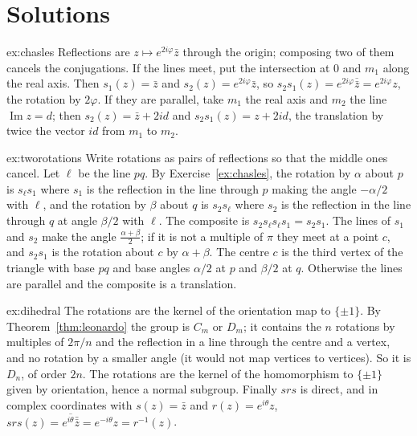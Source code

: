 \section{Solutions}

\begin{solution}{ex:chasles}
\idea Reflections are $z\mapsto e^{2i\varphi}\bar z$ through the origin; composing two of them cancels the conjugations.
\writeup If the lines meet, put the intersection at $0$ and $m_1$ along the real axis. Then $s_1(z)=\bar z$ and $s_2(z)=e^{2i\varphi}\bar z$, so
$s_2s_1(z)=e^{2i\varphi}\overline{\bar z}=e^{2i\varphi}z$, the rotation by $2\varphi$. If they are parallel, take $m_1$ the real axis and $m_2$
the line $\operatorname{Im}z=d$; then $s_2(z)=\bar z+2id$ and $s_2s_1(z)=z+2id$, the translation by twice the vector $id$ from $m_1$ to $m_2$.
\end{solution}

\begin{solution}{ex:tworotations}
\idea Write rotations as pairs of reflections so that the middle ones cancel.
\writeup Let $\ell$ be the line $pq$. By Exercise~\ref{ex:chasles}, the rotation by $\alpha$ about $p$ is $s_\ell s_1$ where $s_1$ is the reflection in the
line through $p$ making the angle $-\alpha/2$ with $\ell$, and the rotation by $\beta$ about $q$ is $s_2s_\ell$ where $s_2$ is the reflection in the
line through $q$ at angle $\beta/2$ with $\ell$. The composite is $s_2s_\ell s_\ell s_1=s_2s_1$. The lines of $s_1$ and $s_2$ make the angle
$\frac{\alpha+\beta}2$; if it is not a multiple of $\pi$ they meet at a point $c$, and $s_2s_1$ is the rotation about $c$ by $\alpha+\beta$. The
centre $c$ is the third vertex of the triangle with base $pq$ and base angles $\alpha/2$ at $p$ and $\beta/2$ at $q$. Otherwise the lines are
parallel and the composite is a translation.
\end{solution}

\begin{solution}{ex:dihedral}
\idea The rotations are the kernel of the orientation map to $\{\pm1\}$.
\writeup By Theorem~\ref{thm:leonardo} the group is $C_m$ or $D_m$; it contains the $n$ rotations by multiples of $2\pi/n$ and the reflection in a
line through the centre and a vertex, and no rotation by a smaller angle (it would not map vertices to vertices). So it is $D_n$, of
order $2n$. The rotations are the kernel of the homomorphism to $\{\pm1\}$ given by orientation, hence a normal subgroup. Finally $srs$ is
direct, and in complex coordinates with $s(z)=\bar z$ and $r(z)=e^{i\theta}z$, $srs(z)=\overline{e^{i\theta}\bar{\bar z}}=e^{-i\theta}z=r^{-1}(z)$.
\end{solution}

